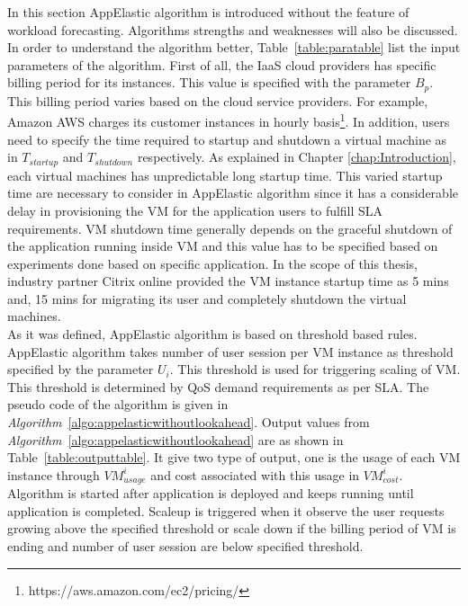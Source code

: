 In this section AppElastic algorithm is introduced without the feature of workload forecasting. Algorithms strengths and weaknesses will also be discussed. In order to understand the algorithm better, Table~\ref{table:paratable} list the input parameters of the algorithm. First of all, the IaaS cloud providers has specific billing period for its instances. This value is specified with the parameter $B_{p}$. This billing period varies based on the cloud service providers. For example, Amazon AWS charges its customer instances in hourly basis\footnote{https://aws.amazon.com/ec2/pricing/}. In addition, users need to specify the time required to startup and shutdown a virtual machine as in $T_{startup}$ and $T_{shutdown}$ respectively. As explained in Chapter \ref{chap:Introduction}, each virtual machines has unpredictable long startup time\cite{mao2012performance}. This varied startup time are necessary to consider in AppElastic algorithm since it has a considerable delay in provisioning the VM for the application users to fulfill SLA requirements. VM shutdown time generally depends on the graceful shutdown of the application running inside VM and this value has to be specified based on experiments done based on specific application. In the scope of this thesis, industry partner Citrix online provided the VM instance startup time as 5 mins and, 15 mins for migrating its user  and completely shutdown the virtual machines.
\\
As it was defined, AppElastic algorithm is based on threshold based rules. AppElastic algorithm takes number of user session per VM instance as threshold specified by the parameter \( U_{i} \). This threshold is used for triggering scaling of VM. This threshold is determined by QoS demand requirements as per SLA. The pseudo code of the algorithm is given in \textit{Algorithm}~\ref{algo:appelasticwithoutlookahead}. Output values from  \textit{Algorithm}~\ref{algo:appelasticwithoutlookahead} are as shown in Table~\ref{table:outputtable}. It give two type of output, one is the usage of each VM instance through $VM_{usage}^{i}$ and cost associated with this usage in $VM_{cost}^{i}$. Algorithm is started after application is deployed and keeps running until application is completed. Scaleup is triggered when it observe the user requests growing above the specified threshold or scale down if the billing period of VM is ending and number of user session are below specified threshold.
\\
